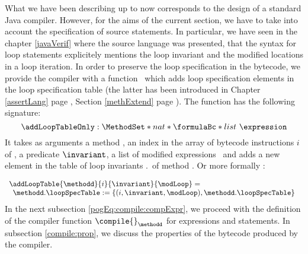  What we have been describing up to now  corresponds to the design of a standard Java compiler. However, for the aims of the current section, we
 have to take into account the specification of source statements. In particular, we have seen in the chapter \ref{javaVerif}  where the 
 source language was presented,  that the syntax for loop statements explicitely
 mentions the loop invariant and the modified locations in a loop iteration. In order to preserve the loop specification in the bytecode, we provide the compiler with a function 
 \addLoopTableOnly \ which adds  loop specification elements in the loop specification table (the latter has been introduced in
 Chapter \ref{assertLang} page \pageref{assertLang}, Section \ref{methExtend} page \pageref{methExtend}). The function has the following signature:
 $$ \addLoopTableOnly : \MethodSet  *  nat *  \formulaBc  *  list \ \expression $$
 It  takes as arguments a method \methodd, an index in the array of bytecode instructions $i$ of \methodd, 
 a predicate $\invariant$, a list of modified expressions \modLoop \ 
 and adds a new element in the table of loop invariants 
 \methodd.\loopSpecTable \ of method \methodd.
 Or more formally :
 
 $$ \begin{array}{l}
  \addLoopTable{\methodd}{ i }{ \invariant  }{ \modLoop} =  \\
   
   \begin{array}{l}
         
         \methodd.\loopSpecTable := \{ (i,\invariant , \modLoop  ) , \methodd.\loopSpecTable \}

   \end{array}
   \end{array}$$
 In  the next subsection \ref{pogEq:compile:compExpr},  we proceed with the definition of the compiler function $\compile{ }_{\methodd} $ for expressions and statements. 
 In subsection \ref{compile:prop}, we discuss the properties of the bytecode produced by the compiler.




%


